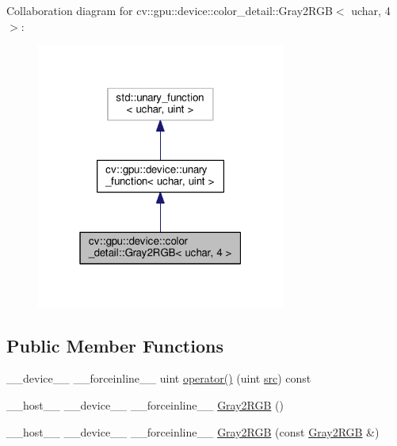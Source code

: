 Collaboration diagram for cv\-:\-:gpu\-:\-:device\-:\-:color\-\_\-detail\-:\-:Gray2\-R\-G\-B$<$ uchar, 4 $>$\-:\nopagebreak
\begin{figure}[H]
\begin{center}
\leavevmode
\includegraphics[width=232pt]{structcv_1_1gpu_1_1device_1_1color__detail_1_1Gray2RGB_3_01uchar_00_014_01_4__coll__graph}
\end{center}
\end{figure}
\subsection*{Public Member Functions}
\begin{DoxyCompactItemize}
\item 
\-\_\-\-\_\-device\-\_\-\-\_\- \-\_\-\-\_\-forceinline\-\_\-\-\_\- uint \hyperlink{structcv_1_1gpu_1_1device_1_1color__detail_1_1Gray2RGB_3_01uchar_00_014_01_4_a164b0ef323b5b800bdba2489fa62543b}{operator()} (uint \hyperlink{legacy_8hpp_a371cd109b74033bc4366f584edd3dacc}{src}) const 
\item 
\-\_\-\-\_\-host\-\_\-\-\_\- \-\_\-\-\_\-device\-\_\-\-\_\- \-\_\-\-\_\-forceinline\-\_\-\-\_\- \hyperlink{structcv_1_1gpu_1_1device_1_1color__detail_1_1Gray2RGB_3_01uchar_00_014_01_4_a23dc1b00e77379acedfe322ed0a8ae20}{Gray2\-R\-G\-B} ()
\item 
\-\_\-\-\_\-host\-\_\-\-\_\- \-\_\-\-\_\-device\-\_\-\-\_\- \-\_\-\-\_\-forceinline\-\_\-\-\_\- \hyperlink{structcv_1_1gpu_1_1device_1_1color__detail_1_1Gray2RGB_3_01uchar_00_014_01_4_a5792c687a4246433ea28453749f59794}{Gray2\-R\-G\-B} (const \hyperlink{structcv_1_1gpu_1_1device_1_1color__detail_1_1Gray2RGB}{Gray2\-R\-G\-B} \&)
\end{DoxyCompactItemize}


